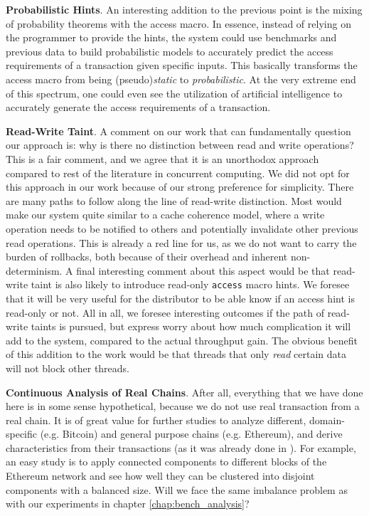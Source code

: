 \textbf{Probabilistic Hints}. An interesting addition to the previous point is the mixing of
probability theorems with the access macro. In essence, instead of relying on the programmer to
provide the hints, the system could use benchmarks and previous data to build probabilistic models
to accurately predict the access requirements of a transaction given specific inputs.  This
basically transforms the access macro from being (pseudo)\textit{static} to \textit{probabilistic}.
At the very extreme end of this spectrum, one could even see the utilization of artificial
intelligence to accurately generate the access requirements of a transaction.

\textbf{Read-Write Taint}. A comment on our work that can fundamentally question our approach is:
why is there no distinction between read and write operations? This is a fair comment, and we agree
that it is an unorthodox approach compared to rest of the literature in concurrent computing. We did
not opt for this approach in our work because of our strong preference for simplicity. There are
many paths to follow along the line of read-write distinction. Most would make our system quite
similar to a cache coherence model, where a write operation needs to be notified to others and
potentially invalidate other previous read operations. This is already a red line for us, as we do
not want to carry the burden of rollbacks, both because of their overhead and inherent
non-determinism. A final interesting comment about this aspect would be that read-write taint is
also likely to introduce read-only \texttt{access} macro hints. We foresee that it will be very
useful for the distributor to be able know if an access hint is read-only or not. All in all, we
foresee interesting outcomes if the path of read-write taints is pursued, but express worry about
how much complication it will add to the system, compared to the actual throughput gain. The obvious
benefit of this addition to the work would be that threads that only \textit{read} certain data will
not block other threads.

\textbf{Continuous Analysis of Real Chains}. After all, everything that we have done here is in some
sense hypothetical, because we do not use real transaction from a real chain. It is of great value
for further studies to analyze different, domain-specific (e.g. Bitcoin) and general purpose chains
(e.g. Ethereum), and derive characteristics from their transactions (as it was already done in
\cite{saraphEmpiricalStudySpeculative2019}). For example, an easy study is to apply connected
components to different blocks of the Ethereum network and see how well they can be clustered into
disjoint components with a balanced size. Will we face the same imbalance problem as with our
experiments in chapter \ref{chap:bench_analysis}?

